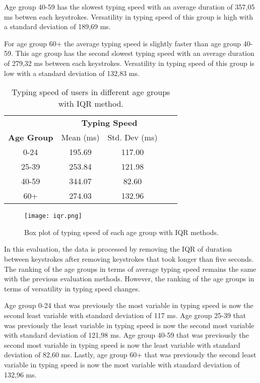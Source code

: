Age group 40-59 has the slowest typing speed with an average duration of 357,05 ms betwen each keystrokes.
Versatility in typing speed of this group is high with a standard deviation of 189,69 ms.

For age group 60+ the average typing speed is slightly faster than age group 40-59.
This age group has the second slowest typing speed with an average duration of 279,32 ms between each keystrokes.
Versatility in typing speed of this group is low with a standard deviation of 132,83 ms.

\begin{table}[h]
    \centering
    \begin{tabular}{ccccc}
    \toprule
    \multicolumn{1}{c}{} & \multicolumn{2}{c}{\textbf{Typing Speed}}\\
    \cmidrule(rl){2-3} \cmidrule(rl){4-5}
    \textbf{Age Group} & {Mean (ms)} & {Std. Dev (ms)} \\
    \midrule
    0-24 & 195.69 & 117.00 \\
    25-39 & 253.84 & 121.98  \\
    40-59 & 344.07 & 82.60  \\
    60+ & 274.03 & 132.96 \\
    \bottomrule
    \end{tabular}
    \caption{Typing speed of users in different age groups with \ac{IQR} method.}
    \label{tab:typing_behavior_iqr}
\end{table}


\begin{figure}[h!]
    \centering
    \texttt{[image: iqr.png]}
    \caption{Box plot of typing speed of each age group with \ac{IQR} methods.}
    \label{box_plot_typing_speed_iqr}
\end{figure}

In this evaluation, the data is processed by removing the \ac{IQR} of duration between keystrokes after removing keystrokes that took longer than five seconds.
The ranking of the age groups in terms of average typing speed remains the same with the previous evaluation methods.
However, the ranking of the age groups in terms of versatility in typing speed changes.

Age group 0-24 that was previously the most variable in typing speed is now the second least variable with standard deviation of 117 ms.
Age group 25-39 that was previously the least variable in typing speed is now the second most variable with standard deviation of 121,98 ms.
Age group 40-59 that was previously the second most variable in typing speed is now the least variable with standard deviation of 82,60 ms.
Lastly, age group 60+ that was previously the second least variable in typing speed is now the most variable with standard deviation of 132,96 ms. 

